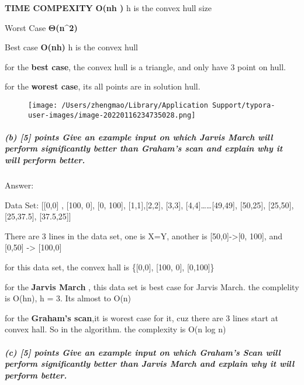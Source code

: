 \documentclass[
]{article}
\begin{document}
\textbf{TIME COMPEXITY} \textbf{O(nh )} h is the convex hull size

Worst Case \textbf{Θ(n\^{}2)}

Best case \textbf{O(nh)} h is the convex hull

for the \textbf{best case}, the convex hull is a triangle, and only have
3 point on hull.

for the \textbf{worest case}, its all points are in solution hull.

\begin{figure}
\centering
\texttt{[image: /Users/zhengmao/Library/Application Support/typora-user-images/image-20220116234735028.png]}
\caption{}
\end{figure}

\hypertarget{b-5-points-give-an-example-input-on-which-jarvis-march-will-perform-significantly-better-than-grahams-scan-and-explain-why-it-will-perform-better}{%
\subparagraph{(b) {[}5{]} points Give an example input on which Jarvis
March will perform significantly better than Graham's scan and explain
why it will perform
better.}\label{b-5-points-give-an-example-input-on-which-jarvis-march-will-perform-significantly-better-than-grahams-scan-and-explain-why-it-will-perform-better}}

Answer:

Data Set: {[}{[}0,0{]} , {[}100, 0{]}, {[}0, 100{]},
{[}1,1{]},{[}2,2{]}, {[}3,3{]}, {[}4,4{]}\ldots\ldots{[}49,49{]},
{[}50,25{]}, {[}25,50{]}, {[}25,37.5{]}, {[}37.5,25{]}{]}

There are 3 lines in the data set, one is X=Y, another is
{[}50,0{]}-\textgreater{[}0, 100{]}, and {[}0,50{]} -\textgreater{}
{[}100,0{]}

for this data set, the convex hall is \{{[}0,0{]}, {[}100, 0{]},
{[}0,100{]}\}

for the \textbf{Jarvis March} , this data set is best case for Jarvis
March. the complelity is O(hn), h = 3. Its almost to O(n)

for the \textbf{Graham's scan},it is worest case for it, cuz there are 3
lines start at convex hall. So in the algorithm. the complexity is O(n
log n)

\hypertarget{c-5-points-give-an-example-input-on-which-grahams-scan-will-perform-significantly-better-than-jarvis-march-and-explain-why-it-will-perform-better}{%
\subparagraph{(c) {[}5{]} points Give an example input on which Graham's
Scan will perform significantly better than Jarvis March and explain why
it will perform
better.}\label{c-5-points-give-an-example-input-on-which-grahams-scan-will-perform-significantly-better-than-jarvis-march-and-explain-why-it-will-perform-better}}
\end{document}
